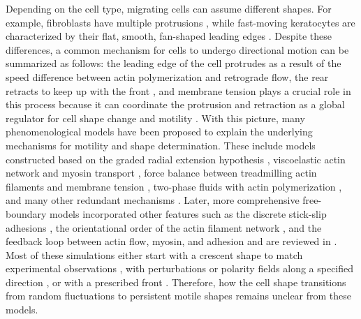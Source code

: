 \documentclass[12pt]{article}
\begin{document}
Depending on the cell type, migrating cells can assume different shapes. 
For example, fibroblasts have multiple protrusions \cite{lo2000cell,Dubin-Thaler2004,Dubin-Thaler2008}, while fast-moving keratocytes are characterized by their flat, smooth, fan-shaped leading edges \cite{keren2008mechanism}. 
Despite these differences, a common mechanism for cells to undergo directional motion can be summarized as follows:
the leading edge of the cell protrudes as a result of the speed difference between actin polymerization and retrograde flow, the rear retracts to keep up with the front \cite{yam2007actin,wilson2010myosin}, and membrane tension plays a crucial role in this process because it can coordinate the protrusion and retraction as a global regulator for cell shape change and motility \cite{lieber2013membrane,diz2013use,sens2015membrane}. 
With this picture, many phenomenological models have been proposed to explain the underlying mechanisms for motility and shape determination. 
These include models constructed based on the graded radial extension hypothesis \cite{rubinstein2005multiscale}, viscoelastic actin network and myosin transport \cite{rubinstein2009actin}, force balance between treadmilling actin filaments and membrane tension \cite{schaus2007self,keren2008mechanism}, two-phase fluids with actin polymerization \cite{herant2010form}, and many other redundant mechanisms \cite{wolgemuth2011redundant}. 
Later, more comprehensive free-boundary models incorporated other features such as the discrete stick-slip adhesions \cite{shao2010computational,shao2012coupling}, the orientational order of the actin filament network \cite{ziebert2012model,tjhung2012spontaneous,tjhung2015minimal,marth2015mechanism}, and the feedback loop between actin flow, myosin, and adhesion \cite{barnhart2015balance} and are  reviewed in \cite{holmes2012comparison}. 
Most of these simulations either start with a crescent shape to match experimental observations \cite{rubinstein2005multiscale, rubinstein2009actin}, with perturbations or polarity fields along a specified direction \cite{shao2010computational,shao2012coupling,ziebert2012model,tjhung2012spontaneous,tjhung2015minimal,marth2015mechanism,barnhart2015balance}, or with a prescribed front \cite{herant2010form}.
Therefore, how the cell shape transitions from random fluctuations to persistent motile shapes remains unclear from these models. 
\end{document}
